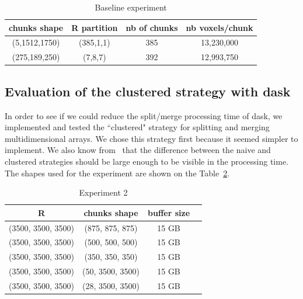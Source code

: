 \documentclass[conference]{IEEEtran}
\begin{document}
\begin{table}[ht]
 \centering
 \caption{Baseline experiment}

  \begin{tabular}[t]{c c c c}
  \hline
  chunks shape & R partition & nb of chunks & nb voxels/chunk \\
    \hline\hline
    (5,1512,1750) & (385,1,1) & 385 & 13,230,000 \\
    \hline
    (275,189,250) & (7,8,7) & 392 & 12,993,750 \\
    \hline
  \end{tabular}

  \label{tab:exp1}
\end{table}

\subsection{Evaluation of the clustered strategy with dask}
In order to see if we could reduce the split/merge processing time of dask, we
implemented and tested the ``clustered" strategy for splitting and merging
multidimensional arrays. We chose this strategy first because it seemed simpler
to implement. We also know from~\cite{seqalgorithms} that the difference between
the naive and clustered strategies should be large enough to be visible in the
processing time. The shapes used for the experiment are shown on the
Table~\ref{tab:exp2}.

\begin{table}[ht]
 \centering
 \caption{Experiment 2}

  \begin{tabular}[t]{c c c c}
  \hline
    R & chunks shape & buffer size \\
    \hline\hline
    (3500, 3500, 3500) & (875, 875, 875) & 15 GB  \\
    \hline
    (3500, 3500, 3500) & (500, 500, 500) & 15 GB  \\
    \hline
    (3500, 3500, 3500) & (350, 350, 350) & 15 GB  \\
    \hline
    (3500, 3500, 3500) & (50, 3500, 3500) & 15 GB \\
    \hline
    (3500, 3500, 3500) & (28, 3500, 3500) & 15 GB \\
    \hline
  \end{tabular}

  \label{tab:exp2}
\end{table}
\end{document}
